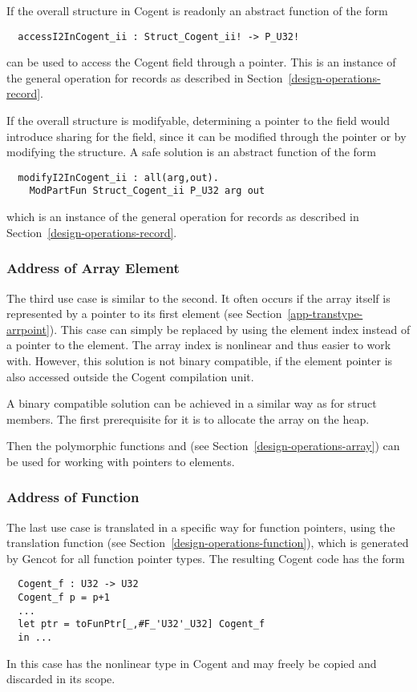 If the overall structure in Cogent is readonly an abstract function of the form
\begin{verbatim}
  accessI2InCogent_ii : Struct_Cogent_ii! -> P_U32!
\end{verbatim}
can be used to access the Cogent field through a pointer. This is an instance of the general  operation
for records as described in Section~\ref{design-operations-record}.

If the overall structure is modifyable, determining a pointer to the field would introduce sharing for the
field, since it can be modified through the pointer or by modifying the structure. A safe solution is an 
abstract function of the form
\begin{verbatim}
  modifyI2InCogent_ii : all(arg,out). 
    ModPartFun Struct_Cogent_ii P_U32 arg out
\end{verbatim}
which is an instance of the general  operation
for records as described in Section~\ref{design-operations-record}.

\subsubsection{Address of Array Element}

The third use case is similar to the second. It often occurs if the array itself is represented by a pointer to its first
element (see Section~\ref{app-transtype-arrpoint}). This case can simply be replaced by using the element index instead of a 
pointer to the element. The array index is nonlinear and thus easier to work with. However, this solution is not binary
compatible, if the element pointer is also accessed outside the Cogent compilation unit.

A binary compatible solution can be achieved in a similar way as for struct members. The first prerequisite for it is
to allocate the array on the heap.

Then the polymorphic functions  and  (see Section~\ref{design-operations-array}) can be used
for working with pointers to elements.

\subsubsection{Address of Function}

The last use case is translated in a specific way for function pointers, using the translation function
 (see Section~\ref{design-operations-function}), which is generated by Gencot for all function
pointer types. The resulting Cogent code has the form
\begin{verbatim}
  Cogent_f : U32 -> U32
  Cogent_f p = p+1
  ...
  let ptr = toFunPtr[_,#F_'U32'_U32] Cogent_f
  in ...
\end{verbatim}
In this case  has the nonlinear type  in Cogent and may freely be copied and
discarded in its scope.

